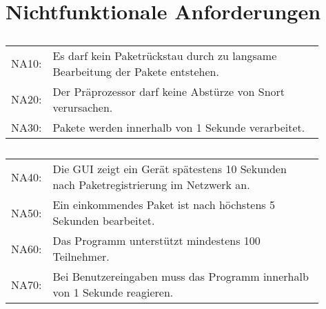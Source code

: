 \chapter{Nichtfunktionale Anforderungen}

\section{\sppname}
\begin{tabular}{lp{0.9\linewidth}}
NA10: & Es darf kein Paketrückstau durch zu langsame Bearbeitung der Pakete entstehen. \\

NA20: & Der Präprozessor darf keine Abstürze von Snort verursachen. \\

NA30: & Pakete werden innerhalb von 1 Sekunde verarbeitet. 
\end{tabular}
\section{\programname}
\begin{tabular}{lp{0.9\linewidth}}
NA40: & Die GUI zeigt ein Gerät spätestens 10 Sekunden nach Paketregistrierung im Netzwerk an. \\

NA50: & Ein einkommendes Paket ist nach höchstens 5 Sekunden bearbeitet. \\

NA60: & Das Programm unterstützt mindestens 100 Teilnehmer. \\

NA70: & Bei Benutzereingaben muss das Programm innerhalb von 1 Sekunde reagieren. \\
\end{tabular}